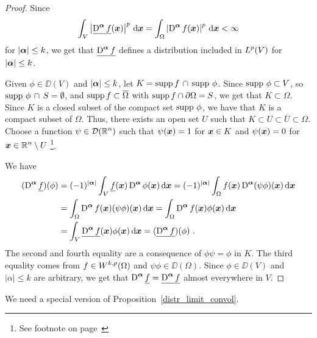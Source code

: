 \begin{proof}
Since
\[
\int_V \left|\underline{\operatorname{D}^{{\bm{\alpha}}} f}({\bm{x}})\right|^p \,\mathrm{d}{{\bm{x}}} = 
\int_{\Omega} \left| \operatorname{D}^{{\bm{\alpha}}} f({\bm{x}}) \right|^p \,\mathrm{d}{{\bm{x}}}
< \infty
\]
for $|{\bm{\alpha}}|\leq k$, we get that
$\displaystyle \underline{\operatorname{D}^{{\bm{\alpha}}} f}$ defines a
distribution included in $\displaystyle L^p(V)$ for $|{\bm{\alpha}}|\leq k$.

Given $\phi \in \DD(V)$ and $|{\bm{\alpha}}|\leq k$, let
$K = \operatorname{supp} f\, \cap\, \operatorname{supp}\, \phi$.  Since $\operatorname{supp}\, \phi \subset V$, so
$\operatorname{supp}\, \phi\, \cap\, S = \emptyset$, and
$\operatorname{supp} f \subset \overline{\Omega}$ with  
$\operatorname{supp} f \cap \partial \Omega = S$, we get that $K \subset \Omega$.
Since $K$ is a closed subset of the compact set $\operatorname{supp}\, \phi$, we have
that $K$ is a compact subset of $\Omega$.  Thus, there exists an open
set $U$ such that $K \subset U \subset \overline{U} \subset \Omega$.
Choose a function $\displaystyle \psi \in \mathcal{D}(\mathbb{R}^n)$ such that
$\psi({\bm{x}}) = 1$ for ${\bm{x}} \in K$ and
$\psi({\bm{x}}) = 0$ for
$\displaystyle {\bm{x}} \in \mathbb{R}^n \setminus U$ \footnote{See
footnote on page~\pageref{FOOTNOTE1}}.

We have
\begin{align*}
(\operatorname{D}^{{\bm{\alpha}}} \underline{f})(\phi)
&= (-1)^{|{\bm{\alpha}}|} \int_V \underline{f}({\bm{x}})
\operatorname{D}^{{\bm{\alpha}}} \phi({\bm{x}})\,\mathrm{d}{{\bm{x}}}
= (-1)^{|{\bm{\alpha}}|} \int_{\Omega} f({\bm{x}})
\operatorname{D}^{{\bm{\alpha}}} (\psi \phi)({\bm{x}})\,\mathrm{d}{{\bm{x}}} \\
&= \int_{\Omega} \operatorname{D}^{{\bm{\alpha}}} f({\bm{x}}) (\psi \phi)({\bm{x}})\,\mathrm{d}{{\bm{x}}}
= \int_{\Omega} \operatorname{D}^{{\bm{\alpha}}} f({\bm{x}}) \phi({\bm{x}})\,\mathrm{d}{{\bm{x}}} \\
&= \int_V \underline{\operatorname{D}^{{\bm{\alpha}}} f}({\bm{x}}) \phi({\bm{x}})\,\mathrm{d}{{\bm{x}}}
= (\underline{\operatorname{D}^{{\bm{\alpha}}} f}) (\phi) \ .
\end{align*}
The second and fourth equality are a
consequence of $\phi \psi = \phi$ in $K$.  The third equality comes
from $\displaystyle f \in W^{k,p}(\Omega)$ and $\psi \phi \in \DD(\Omega)$.
Since $\phi \in \DD(V)$ and $|\alpha|\leq k$ are arbitrary,
we get that $\displaystyle \operatorname{D}^{{\bm{\alpha}}} \underline{f}
= \underline{\operatorname{D}^{{\bm{\alpha}}} f}$
almost everywhere in $V$.
\end{proof}

We need a special version of Proposition~\ref{distr_limit_convol}.

